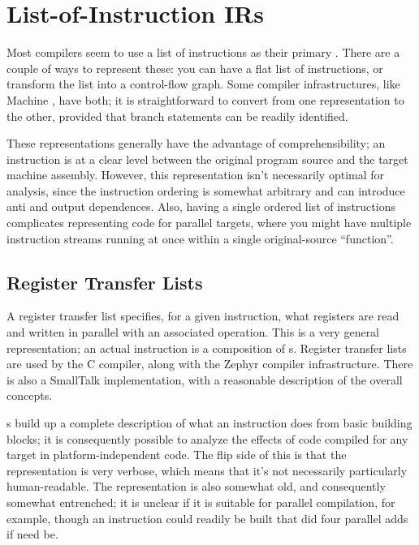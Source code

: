 \documentclass[11pt]{article}
\begin{document}
\section{List-of-Instruction IRs}

Most compilers seem to use a list of instructions as their primary
\ir.  There are a couple of ways to represent these: you can have a
flat list of instructions, or transform the list into a control-flow
graph.  Some compiler infrastructures, like Machine
\suif{}\cite{machsuif}, have both; it is straightforward to convert
from one representation to the other, provided that branch statements
can be readily identified.

These representations generally have the advantage of
comprehensibility; an instruction is at a clear level between the
original program source and the target machine assembly.  However,
this representation isn't necessarily optimal for analysis, since the
instruction ordering is somewhat arbitrary and can introduce anti and
output dependences.  Also, having a single ordered list of
instructions complicates representing code for parallel targets, where
you might have multiple instruction streams running at once within a
single original-source ``function''.

\subsection{Register Transfer Lists}

A register transfer list specifies, for a given instruction, what
registers are read and written in parallel with an associated
operation.  This is a very general representation; an actual
instruction is a composition of \rtl{}s.  Register transfer lists are
used by the \gnu C compiler, along with the Zephyr compiler
infrastructure\cite{rtl-zephyr}.  There is also a SmallTalk
implementation, with a reasonable description of the overall
concepts\cite{rtl-smalltalk}.

\rtl{}s build up a complete description of what an instruction does
from basic building blocks; it is consequently possible to analyze the
effects of code compiled for any target in platform-independent code.
The flip side of this is that the representation is very verbose,
which means that it's not necessarily particularly human-readable.
The \rtl representation is also somewhat old, and consequently
somewhat entrenched; it is unclear if it is suitable for parallel
compilation, for example, though an instruction could readily be built
that did four parallel adds if need be.
\end{document}
